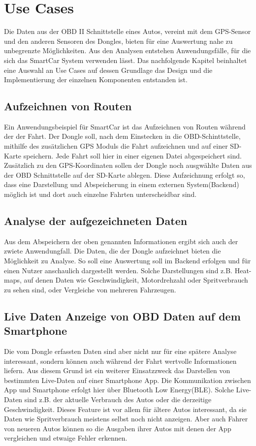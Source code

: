 \chapter{Use Cases}
\label{sec:useCases}
Die Daten aus der OBD II Schnittstelle eines Autos, vereint mit dem GPS-Sensor und den anderen Sensoren des Dongles, bieten für eine Auswertung nahe zu unbegrenzte Möglichkeiten. Aus den Analysen entstehen Anwendungsfälle, für die sich das SmartCar System verwenden lässt. Das nachfolgende Kapitel beinhaltet eine Auswahl an Use Cases auf dessen Grundlage das Design und die Implementierung der einzelnen Komponenten entstanden ist.
\section{Aufzeichnen von Routen}
Ein Anwendungsbeispiel für SmartCar ist das Aufzeichnen von Routen während der der Fahrt. Der Dongle soll, nach dem Einstecken in die OBD-Schinttstelle, mithilfe des zusätzlichen GPS Moduls die Fahrt aufzeichnen und auf einer SD-Karte speichern. Jede Fahrt soll hier in einer eigenen Datei abgespeichert sind. Zusätzlich zu den GPS-Koordinaten sollen der Dongle noch ausgwählte Daten aus der OBD Schnittstelle auf der SD-Karte ablegen. Diese Aufzeichnung erfolgt so, dass eine Darstellung und Abspeicherung in einem externen System(Backend) möglich ist und dort auch einzelne Fahrten unterscheidbar sind.
\section{Analyse der aufgezeichneten Daten}
Aus dem Abspeichern der oben genannten Informationen ergibt sich auch der zwiete Anwendungfall. Die Daten, die der Dongle aufzeichnet bieten die Möglichkeit zu Analyse. So soll eine Auswertung soll im Backend erfolgen und für einen Nutzer anschaulich dargestellt werden. Solche Darstellungen sind z.B. Heat-maps, auf denen Daten wie Geschwindigkeit, Motordrehzahl oder Spritverbrauch zu sehen sind, oder Vergleiche von mehreren Fahrzeugen.
\section{Live Daten Anzeige von OBD Daten auf dem Smartphone}
Die vom Dongle erfassten Daten sind aber nicht nur für eine spätere Analyse interessant, sondern können auch während der Fahrt wertvolle Informationen liefern. Aus diesem Grund ist ein weiterer Einsatzzweck das Darstellen von bestimmten Live-Daten auf einer Smartphone App. Die Kommunikation zwischen App und Smartphone erfolgt hier über Bluetooth Low Energy(BLE). Solche Live-Daten sind z.B. der aktuelle Verbrauch des Autos oder die derzeitige Geschwindigkeit. Dieses Feature ist vor allem für ältere Autos interessant, da sie Daten wie Spritverbrauch meistens selbst noch nicht anzeigen. Aber auch Fahrer von neueren Autos können so die Ausgaben ihrer Autos mit denen der App vergleichen und etwaige Fehler erkennen.
 
